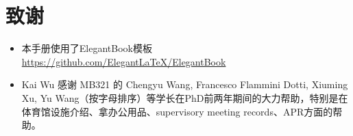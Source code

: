 \chapter{致谢}
\begin{itemize}
    \item 本手册使用了ElegantBook模板 \url{https://github.com/ElegantLaTeX/ElegantBook}
    \item Kai Wu 感谢 MB321 的 Chengyu Wang, Francesco Flammini Dotti, Xiuming Xu, Yu Wang（按字母排序）等学长在PhD前两年期间的大力帮助，特别是在体育馆设施介绍、拿办公用品、supervisory meeting records、APR方面的帮助。
\end{itemize}





